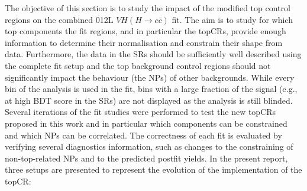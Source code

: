 The objective of this section is to study the impact of the modified top control regions on the combined 012L $VH(H\rightarrow c\bar{c})$ fit. The aim is to study for which top components the fit regions, and in particular the topCRs, provide enough information to determine their normalisation and constrain their shape from data. Furthermore, the data in the SRs should be sufficiently well described using the complete fit setup and the top background control regions should not significantly impact the behaviour (the NPs) of other backgrounds. While every bin of the analysis is used in the fit, bins with a large fraction of the signal (e.g., at high BDT score in the SRs) are not displayed as the analysis is still blinded. \\

Several iterations of the fit studies were performed to test the new topCRs proposed in this work and in particular which components can be constrained and which NPs can be correlated. The correctness of each fit is evaluated by verifying several diagnostics information, such as changes to the constraining of non-top-related NPs and to the predicted postfit yields. In the present report, three setups are presented to represent the evolution of the implementation of the topCR:
